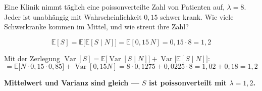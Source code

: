 \begin{aufgabe}
Eine Klinik nimmt täglich eine poissonverteilte Zahl von Patienten auf, $\lambda = 8$. Jeder ist unabhängig mit Wahrscheinlichkeit $0{,}15$ schwer krank. Wie viele Schwerkranke kommen im Mittel, und wie streut ihre Zahl?

\loesung
{}
\[ \mathbb{E}[S] = \mathbb{E}\bigl[\mathbb{E}[S \mid N]\bigr] = \mathbb{E}[0{,}15\,N] = 0{,}15\cdot8 = 1{,}2 \]

Mit der Zerlegung $\operatorname{Var}[S] = \mathbb{E}\bigl[\operatorname{Var}[S\mid N]\bigr] + \operatorname{Var}\bigl[\mathbb{E}[S\mid N]\bigr]$:
\[ = \mathbb{E}\bigl[N\cdot0{,}15\cdot0{,}85\bigr] + \operatorname{Var}[0{,}15N] = 8\cdot0{,}1275 + 0{,}0225\cdot8 = 1{,}02+0{,}18 = 1{,}2 \]

\begin{center}
\begin{minipage}{0.9\textwidth}
\textbf{Mittelwert und Varianz sind gleich --- $S$ ist poissonverteilt mit $\lambda = 1{,}2$.}
\end{minipage}
\end{center}

\begin{center}
\begin{minipage}{0.88\textwidth}
\end{minipage}
\end{center}
\end{aufgabe}

